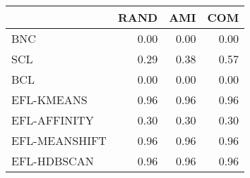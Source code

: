 \begin{tabular}{lrrr}
\toprule
 & RAND & AMI & COM \\
\midrule
BNC & 0.00 & 0.00 & 0.00 \\
SCL & 0.29 & 0.38 & 0.57 \\
BCL & 0.00 & 0.00 & 0.00 \\
EFL-KMEANS & 0.96 & 0.96 & 0.96 \\
EFL-AFFINITY & 0.30 & 0.30 & 0.30 \\
EFL-MEANSHIFT & 0.96 & 0.96 & 0.96 \\
EFL-HDBSCAN & 0.96 & 0.96 & 0.96 \\
\bottomrule
\end{tabular}
